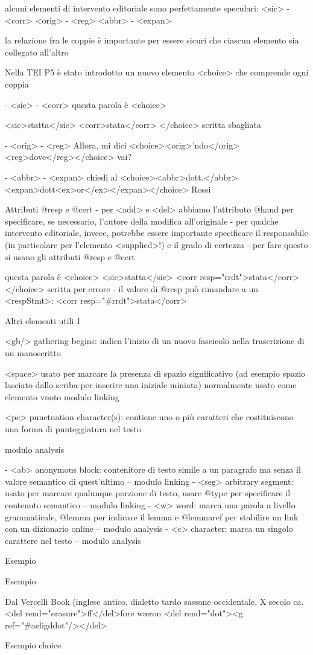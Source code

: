  alcuni elementi di intervento editoriale sono perfettamente speculari:
<sic> - <corr> <orig> - <reg> <abbr> - <expan>


la relazione fra le coppie è importante per essere sicuri che ciascun elemento sia collegato all’altro

Nella TEI P5 è stato introdotto un nuovo elemento <choice> che comprende ogni coppia

- <sic> - <corr>
questa parola è <choice>

<sic>statta</sic>
<corr>stata</corr> </choice> scritta sbagliata

- <orig> - <reg>
Allora, mi dici <choice><orig>’ndo</orig> <reg>dove</reg></choice> vai?

- <abbr> - <expan>
chiedi al <choice><abbr>dott.</abbr> <expan>dott<ex>or</ex></expan></choice> Rossi

Attributi @resp e @cert
- per <add> e <del> abbiamo l’attributo @hand per specificare, se necessario, l’autore della modifica all’originale
- per qualche intervento editoriale, invece, potrebbe essere importante specificare il responsabile (in particolare per l’elemento <supplied>!) e il grado di certezza
- per fare questo si usano gli attributi @resp e @cert

questa parola è <choice>
<sic>statta</sic>
<corr resp="rrdt">stata</corr> </choice> scritta per errore
- il valore di @resp può rimandare a un <respStmt>: <corr resp="\#rrdt">stata</corr>


Altri elementi utili 1

<gb/> gathering begins: indica l’inizio di un nuovo fascicolo nella trascrizione di un manoscritto

<space> usato per marcare la presenza di spazio significativo (ad esempio spazio lasciato dallo scriba per inserire una iniziale miniata)
normalmente usato come elemento vuoto modulo linking

<pc> punctuation character(s): contiene uno o più caratteri che costituiscono una forma di punteggiatura nel testo

modulo analysis

- <ab> anonymous block: contenitore di testo simile a un paragrafo ma senza il valore semantico di quest’ultimo
– modulo linking
- <seg> arbitrary segment: usato per marcare qualunque porzione di testo,
usare @type per specificare il contenuto semantico – modulo linking
- <w> word: marca una parola a livello grammaticale, @lemma per indicare il lemma e @lemmaref per stabilire un link con un dizionario online
– modulo analysis
- <c> character: marca un singolo carattere nel testo
– modulo analysis

Esempio

Esempio

Dal Vercelli Book (inglese antico, dialetto tardo sassone occidentale, X secolo ca.
<del rend="erasure">ff</del>fore wæron
<del rend="dot"><g ref="\#aeligddot"/></del>

Esempio choice


